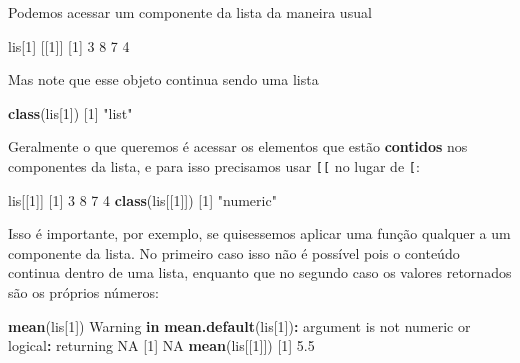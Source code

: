 \documentclass[10pt,a4paper]{book}
\newenvironment{Shaded}{\begin{snugshade}}{\end{snugshade}}
\newcommand{\KeywordTok}[1]{\textcolor[rgb]{0.13,0.29,0.53}{\textbf{#1}}}
\newcommand{\DecValTok}[1]{\textcolor[rgb]{0.00,0.00,0.81}{#1}}
\newcommand{\FloatTok}[1]{\textcolor[rgb]{0.00,0.00,0.81}{#1}}
\newcommand{\StringTok}[1]{\textcolor[rgb]{0.31,0.60,0.02}{#1}}
\newcommand{\OtherTok}[1]{\textcolor[rgb]{0.56,0.35,0.01}{#1}}
\newcommand{\ControlFlowTok}[1]{\textcolor[rgb]{0.13,0.29,0.53}{\textbf{#1}}}
\newcommand{\OperatorTok}[1]{\textcolor[rgb]{0.81,0.36,0.00}{\textbf{#1}}}
\newcommand{\NormalTok}[1]{#1}
\begin{document}
Podemos acessar um componente da lista da maneira usual

\begin{Shaded}
\begin{Highlighting}[]
\NormalTok{lis[}\DecValTok{1}\NormalTok{]}
\NormalTok{[[}\DecValTok{1}\NormalTok{]]}
\NormalTok{[}\DecValTok{1}\NormalTok{] }\DecValTok{3} \DecValTok{8} \DecValTok{7} \DecValTok{4}
\end{Highlighting}
\end{Shaded}

Mas note que esse objeto continua sendo uma lista

\begin{Shaded}
\begin{Highlighting}[]
\KeywordTok{class}\NormalTok{(lis[}\DecValTok{1}\NormalTok{])}
\NormalTok{[}\DecValTok{1}\NormalTok{] }\StringTok{"list"}
\end{Highlighting}
\end{Shaded}

Geralmente o que queremos é acessar os elementos que estão
\textbf{contidos} nos componentes da lista, e para isso precisamos usar
\texttt{{[}{[}} no lugar de \texttt{{[}}:

\begin{Shaded}
\begin{Highlighting}[]
\NormalTok{lis[[}\DecValTok{1}\NormalTok{]]}
\NormalTok{[}\DecValTok{1}\NormalTok{] }\DecValTok{3} \DecValTok{8} \DecValTok{7} \DecValTok{4}
\KeywordTok{class}\NormalTok{(lis[[}\DecValTok{1}\NormalTok{]])}
\NormalTok{[}\DecValTok{1}\NormalTok{] }\StringTok{"numeric"}
\end{Highlighting}
\end{Shaded}

Isso é importante, por exemplo, se quisessemos aplicar uma função
qualquer a um componente da lista. No primeiro caso isso não é possível
pois o conteúdo continua dentro de uma lista, enquanto que no segundo
caso os valores retornados são os próprios números:

\begin{Shaded}
\begin{Highlighting}[]
\KeywordTok{mean}\NormalTok{(lis[}\DecValTok{1}\NormalTok{])}
\NormalTok{Warning }\ControlFlowTok{in} \KeywordTok{mean.default}\NormalTok{(lis[}\DecValTok{1}\NormalTok{])}\OperatorTok{:}\StringTok{ }\NormalTok{argument is not numeric or logical}\OperatorTok{:}\StringTok{ }\NormalTok{returning}
\OtherTok{NA}
\NormalTok{[}\DecValTok{1}\NormalTok{] }\OtherTok{NA}
\KeywordTok{mean}\NormalTok{(lis[[}\DecValTok{1}\NormalTok{]])}
\NormalTok{[}\DecValTok{1}\NormalTok{] }\FloatTok{5.5}
\end{Highlighting}
\end{Shaded}
\end{document}
